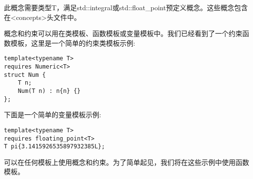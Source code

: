 此概念需要类型T，满足std::integral或std::float\_point预定义概念。这些概念包含在<concepts>头文件中。

概念和约束可以用在类模板、函数模板或变量模板中。我们已经看到了一个约束函数模板，这里是一个简单的约束类模板示例:

\begin{lstlisting}[style=styleCXX]
template<typename T>
requires Numeric<T>
struct Num {
	T n;
	Num(T n) : n{n} {}
};
\end{lstlisting}

下面是一个简单的变量模板示例:

\begin{lstlisting}[style=styleCXX]
template<typename T>
requires floating_point<T>
T pi{3.1415926535897932385L};
\end{lstlisting}

可以在任何模板上使用概念和约束。为了简单起见，我们将在这些示例中使用函数模板。

